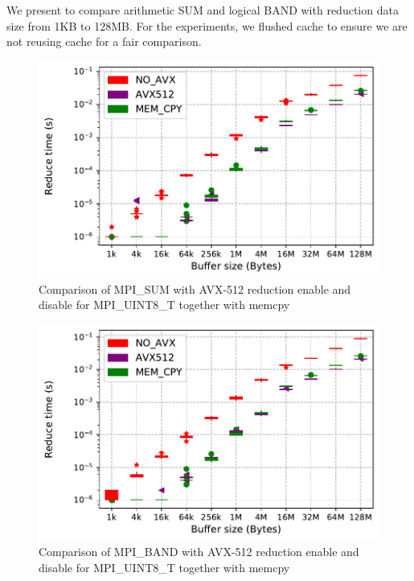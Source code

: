 \documentclass[5p,times,twocolumn]{elsarticle}
\begin{document}
We present to compare arithmetic SUM and logical BAND with reduction data size from 1KB to 128MB.
For the experiments, we flushed cache to ensure we are not reusing cache for a fair comparison.

\begin{figure}[h]
    \centering
    \includegraphics[width=\linewidth]{avx_extend_more_sum_u8_1k-128M.pdf}
    \caption{Comparison of MPI\_SUM with AVX-512 reduction enable and disable for MPI\_UINT8\_T together with memcpy}
    \label{fig:avxsum}
\end{figure}

\begin{figure}[h]
    \centering
    \includegraphics[width=\linewidth]{avx_extend_more_prod_u8_1k-128M.pdf}
    \caption{Comparison of MPI\_BAND with AVX-512 reduction enable and disable for MPI\_UINT8\_T together with memcpy}
    \label{fig:avxband}
\end{figure}
\end{document}
